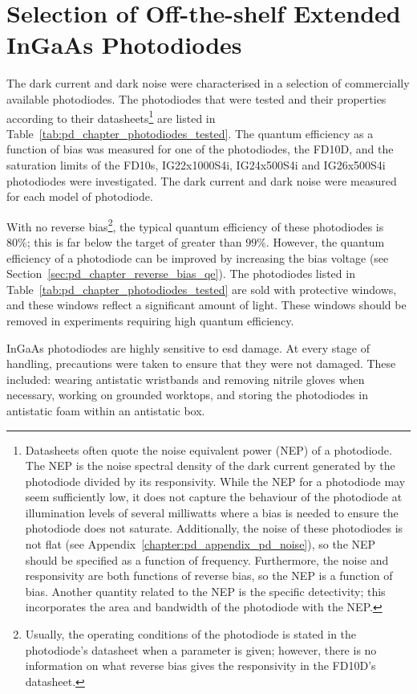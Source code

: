\section{Selection of Off-the-shelf Extended InGaAs Photodiodes}
The dark current and dark noise were characterised in a selection of commercially available photodiodes. The photodiodes that were tested and their properties according to their datasheets\footnote{Datasheets often quote the noise equivalent power (NEP) of a photodiode. The NEP is the noise spectral density of the dark current generated by the photodiode divided by its responsivity. While the NEP for a photodiode may seem sufficiently low, it does not capture the behaviour of the photodiode at illumination levels of several milliwatts where a bias is needed to ensure the photodiode does not saturate. Additionally, the noise of these photodiodes is not flat (see Appendix~\ref{chapter:pd_appendix_pd_noise}), so the NEP should be specified as a function of frequency. Furthermore, the noise and responsivity are both functions of reverse bias, so the NEP is a function of bias. Another quantity related to the NEP is the specific detectivity; this incorporates the area and bandwidth of the photodiode with the NEP.} are listed in Table~\ref{tab:pd_chapter_photodiodes_tested}. The quantum efficiency as a function of bias was measured for one of the photodiodes, the FD10D, and the saturation limits of the FD10s, IG22x1000S4i, IG24x500S4i and IG26x500S4i photodiodes were investigated. The dark current and dark noise were measured for each model of photodiode. 
\par
With no reverse bias\footnote{Usually, the operating conditions of the photodiode is stated in the photodiode's datasheet when a parameter is given; however, there is no information on what reverse bias gives the responsivity in the FD10D's datasheet.}, the typical quantum efficiency of these photodiodes is 80\%; this is far below the target of greater than $99$\%. However, the quantum efficiency of a photodiode can be improved by increasing the bias voltage (see Section~\ref{sec:pd_chapter_reverse_bias_qe}). The photodiodes listed in Table~\ref{tab:pd_chapter_photodiodes_tested} are sold with protective windows, and these windows reflect a significant amount of light. These windows should be removed in experiments requiring high quantum efficiency.
\par 
InGaAs photodiodes are highly sensitive to \gls{esd} damage. At every stage of handling, precautions were taken to ensure that they were not damaged. These included: wearing antistatic wristbands and removing nitrile gloves when necessary, working on grounded worktops, and storing the photodiodes in antistatic foam within an antistatic box.
